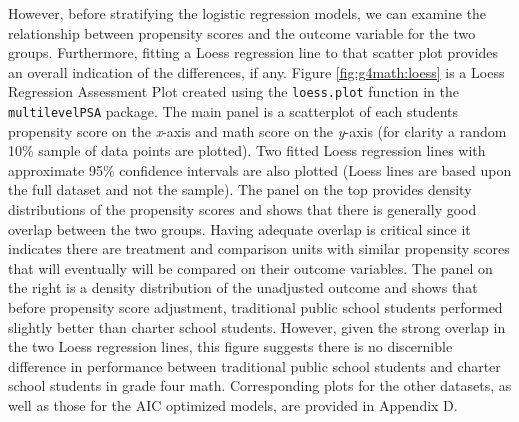 \documentclass[letterpaper,12p,twoside]{article} %
\begin{document}
However, before stratifying the logistic regression models, we can examine the relationship between propensity scores and the outcome variable for the two groups. Furthermore, fitting a Loess regression line to that scatter plot provides an overall indication of the differences, if any. Figure \ref{fig:g4math:loess} is a Loess Regression Assessment Plot created using the \texttt{loess.plot} function in the \texttt{multilevelPSA} package. The main panel is a scatterplot of each students propensity score on the \textit{x}-axis and math score on the \textit{y}-axis (for clarity a random 10\% sample of data points are plotted). Two fitted Loess regression lines with approximate 95\% confidence intervals are also plotted (Loess lines are based upon the full dataset and not the sample). The panel on the top provides density distributions of the propensity scores and shows that there is generally good overlap between the two groups. Having adequate overlap is critical since it indicates there are treatment and comparison units with similar propensity scores that will eventually will be compared on their outcome variables. The panel on the right is a density distribution of the unadjusted outcome and shows that before propensity score adjustment, traditional public school students performed slightly better than charter school students. However, given the strong overlap in the two Loess regression lines, this figure suggests there is no discernible difference in performance between traditional public school students and charter school students in grade four math. Corresponding plots for the other datasets, as well as those for the AIC optimized models, are provided in Appendix D.
\end{document}
